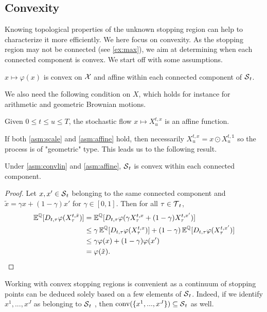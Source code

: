 \subsection{Convexity}
Knowing topological properties of the unknown stopping region can help to characterize it more efficiently. We here focus on convexity. As the stopping region may not be connected (see \cref{ex:max}), we aim at determining when each connected component is convex.  We start off with some assumptions. 

\begin{asm}\label{asm:convlin}
$x \mapsto \varphi(x)$ is convex on $\operatorname{\mathcal{X}}$ and affine within each connected component of  $\operatorname{\mathcal{S}}_t$. 
\end{asm}

We also need the following condition on $X$, which holds for instance for arithmetic and geometric Brownian motions. 
\begin{asm} \label{asm:affine}
    Given $0\le t \le u \le T$, the stochastic flow $x \mapsto X_u^{t,x}$  is an affine function.
\end{asm}

If both \cref{asm:scale} and  \ref{asm:affine}  hold, then necessarily $X_u^{t,x} = x \odot X_u^{t,\mathds{1}}$ so  the process is of "geometric" type. This leads us to the following result. 

\begin{proposition}
Under \cref{asm:convlin} and \ref{asm:affine}, $\operatorname{\mathcal{S}}_t$ is convex within each connected component.
\end{proposition}

\begin{proof}
Let $x,x'\in \operatorname{\mathcal{S}}_t$ belonging to the same connected component and  $\tilde{x}=\gamma x + (1-\gamma)x'$ for $\gamma \in [0,1]$. Then for all $\tau \in \operatorname{\mathcal{T}}_t$,
\begin{align*}
\E^{\Q}[D_{t,\tau}\varphi(X^{t,\tilde{x}}_\tau)] &=%
\E^{\Q}[D_{t,\tau} \varphi(\gamma X^{t,x}_\tau + (1-\gamma) X^{t,x'}_\tau)]\\
    &\leq%
    \gamma \E^{\Q}[D_{t,\tau}\varphi(X^{t,x}_\tau)]
    +
    (1-\gamma)\E^{\Q}[D_{t,\tau}\varphi(X^{t,x'}_\tau)]\\
    &\leq \gamma \varphi(x) + (1-\gamma) \varphi(x')\\
    &= %
    \varphi(\tilde{x}).
\end{align*}
\end{proof}
Working with convex stopping regions is convenient as a continuum of stopping points can be deduced solely based on a few elements of $\operatorname{\mathcal{S}}_t$. Indeed, if we identify $x^{1},...,x^{J}$ as belonging to  $\operatorname{\mathcal{S}}_t$ %
, then   $\text{conv}(\{x^{1},...,x^{J}\}) \subseteq \operatorname{\mathcal{S}}_t$ as well.
